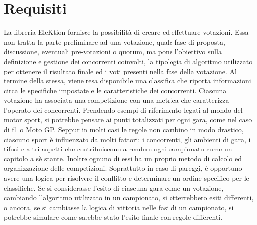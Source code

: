 \documentclass[12pt,a4paper,openright,twoside]{book}
\begin{document}
\section{Requisiti}
La libreria EleKtion fornisce la possibilità di creare ed effettuare votazioni.
Essa non tratta la parte preliminare ad una votazione, quale fase di proposta, discussione,
eventuali pre-votazioni o quorum, ma pone l'obiettivo sulla definizione e gestione dei concorrenti coinvolti,
la tipologia di algoritmo utilizzato per ottenere il risultato finale ed i voti presenti nella fase della votazione.
Al termine della stessa, viene resa disponibile una classifica che riporta informazioni 
circa le specifiche impostate e le caratteristiche dei concorrenti.
Ciascuna votazione ha associata una competizione con una metrica che caratterizza l'operato dei concorrenti.
Prendendo esempi di riferimento legati al mondo del motor sport,
si potrebbe pensare ai punti totalizzati per ogni gara, come nel caso di \ac{f1} o Moto GP.
Seppur in molti casi le regole non cambino in modo drastico, ciascuno sport è influenzato da molti fattori:
i concorrenti, gli ambienti di gara, i tifosi e altri aspetti che contribuiscono a rendere 
ogni campionato come un capitolo a sè stante. 
Inoltre ognuno di essi ha un proprio metodo di calcolo ed organizzazione delle competizioni. 
Soprattutto in caso di pareggi, è opportuno avere una logica per risolvere il conflitto e determinare un ordine specifico per
le classifiche. 
Se si considerasse l'esito di ciascuna gara come un votazione, cambiando
l'algoritmo utilizzato in un campionato, si otterrebbero esiti differenti, o ancora,
se si cambiasse la logica di vittoria nelle fasi di un campionato, si potrebbe simulare come
sarebbe stato l'esito finale con regole differenti.
\end{document}
